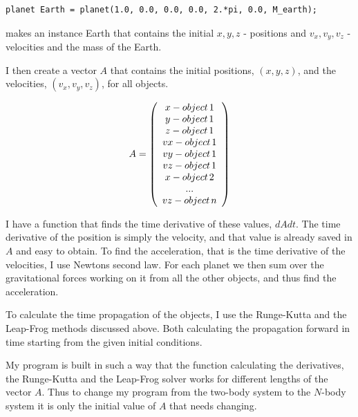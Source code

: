 \documentclass[a4paper,12pt, english]{article}
\begin{document}
\begin{lstlisting}[title={Making of instance}]
planet Earth = planet(1.0, 0.0, 0.0, 0.0, 2.*pi, 0.0, M_earth);
\end{lstlisting} 

makes an instance Earth that contains the initial $x, y, z$ - positions and $v_x, v_y, v_z$ - velocities and the mass of the Earth.

I then create a vector $A$ that contains the initial positions, $(x,y,z)$, and the velocities, $(v_x,v_y,v_z)$, for all objects.

\[ A = \left( \begin{array}{c}
x - object \hspace*{0.5mm} 1\\
y - object \hspace*{0.5mm} 1\\
z - object \hspace*{0.5mm} 1 \\
vx - object \hspace*{0.5mm} 1\\
vy -object \hspace*{0.5mm}  1\\
vz - object \hspace*{0.5mm} 1 \\
x - object \hspace*{0.5mm} 2\\
... \\
vz - object \hspace*{0.5mm} n \end{array} \right)\]    

I have a function that finds the time derivative of these values, $dAdt$. The time derivative of the position is simply the velocity, and that value is already saved in $A$ and easy to obtain. To find the acceleration, that is the time derivative of the velocities, I use Newtons second law. For each planet we then sum over the gravitational forces working on it from all the other objects, and thus find the acceleration. 

To calculate the time propagation of the objects, I use the Runge-Kutta and the Leap-Frog methods discussed above. Both calculating the propagation forward in time starting from the given initial conditions. 

My program is built in such a way that the function calculating the derivatives, the Runge-Kutta and the Leap-Frog solver works for different lengths of the vector $A$. Thus to change my program from the two-body system to the $N$-body system it is only the initial value of $A$ that needs changing.
\end{document}

